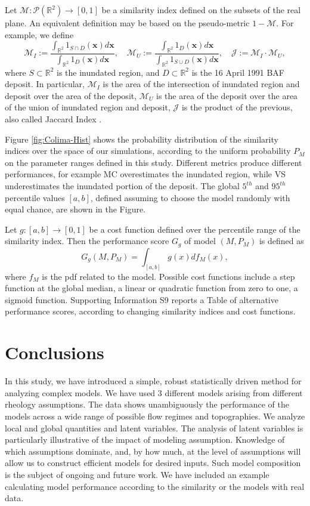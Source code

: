 \documentclass{article}
\begin{document}
Let $\mathcal M:\mathcal P(\mathbb R^2)\rightarrow[0,1]$ be a similarity index defined on the subsets of the real plane. An equivalent definition may be based on the pseudo-metric $1-\mathcal M$. For example, we define
$$\mathcal M_I:=\frac{\int_{\mathbb R^2} 1_{S \cap D}(\textbf{x}) d\textbf{x}}{\int_{\mathbb R^2} 1_D(\textbf{x})d\textbf{x}},\quad \mathcal M_U:=\frac{\int_{\mathbb R^2} 1_D(\textbf{x})d\textbf{x}}{\int_{\mathbb R^2} 1_{S \cup D}(\textbf{x}) d\textbf{x}}, \quad \mathcal J:=\mathcal M_I\cdot \mathcal M_U,$$
where $S\subset \mathbb R^2$ is the inundated region, and $D\subset \mathbb R^2$ is the 16 April 1991 BAF deposit. In particular, $\mathcal M_I$ is the area of the intersection of inundated region and deposit over the area of the deposit, $\mathcal M_U$ is the area of the deposit over the area of the union of inundated region and deposit, $\mathcal J$ is the product of the previous, also called Jaccard Index \citep{Jaccard1901}. 

Figure \ref{fig:Colima-Hist} shows the probability distribution of the similarity indices over the space of our simulations, according to the uniform probability $P_M$ on the parameter ranges defined in this study. Different metrics produce different performances, for example MC overestimates the inundated region, while VS underestimates the inundated portion of the deposit. The global $5^{th}$ and $95^{th}$ percentile values $[a,b]$, defined assuming to choose the model randomly with equal chance, are shown in the Figure.

Let $g:[a,b]\rightarrow[0,1]$ be a cost function defined over the percentile range of the similarity index. Then the performance score $G_g$ of model $\left(M, P_M\right)$ is defined as
$$G_g\left(M, P_M\right)=\int_{[a,b]} g(x) df_M(x),$$
where $f_M$ is the pdf related to the model. Possible cost functions include a step function at the global median, a linear or quadratic function from zero to one, a sigmoid function.  Supporting Information S9 reports a Table of alternative performance scores, according to changing similarity indices and cost functions.

\section{Conclusions}
In this study, we have introduced a simple, robust statistically driven method for analyzing complex models. We have used 3 different models arising from different rheology assumptions. The data shows unambiguously the performance of the models across a wide range of possible flow regimes and topographies. We analyze local and global quantities and latent variables. The analysis of latent variables is particularly illustrative of the impact of modeling assumption. Knowledge of which assumptions dominate, and, by how much, at the level of assumptions will allow us to construct efficient models for desired inputs. Such model composition is the subject of ongoing and future work. We have included an example calculating model performance according to the similarity or the models with real data.
\end{document}
